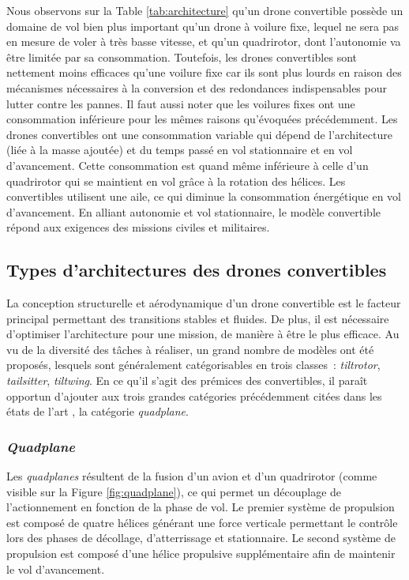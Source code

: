    Nous observons sur la Table \ref{tab:architecture} qu'un drone convertible possède un domaine de vol bien plus important qu'un drone à voilure fixe, lequel ne sera pas en mesure de voler à très basse vitesse, et qu'un quadrirotor, dont l'autonomie va être limitée par sa consommation. Toutefois, les drones convertibles sont nettement moins efficaces qu'une voilure fixe car ils sont plus lourds en raison des mécanismes nécessaires à la conversion et des redondances indispensables pour lutter contre les pannes. Il faut aussi noter que les voilures fixes ont une consommation inférieure pour les mêmes raisons qu'évoquées précédemment. Les drones convertibles ont une consommation variable qui dépend de l'architecture (liée à la masse ajoutée) et du temps passé en vol stationnaire et en vol d'avancement. Cette consommation est quand même inférieure à celle d'un quadrirotor qui se maintient en vol grâce à la rotation des hélices. Les convertibles utilisent une aile, ce qui diminue la consommation énergétique en vol d'avancement. En alliant autonomie et vol stationnaire, le modèle convertible répond aux exigences des missions civiles et militaires.

    \subsection{Types d'architectures des drones convertibles}
    \label{sec:archConvertible}
    La conception structurelle et aérodynamique d'un drone convertible est le facteur principal permettant des transitions stables et fluides. De plus, il est nécessaire d'optimiser l'architecture pour une mission, de manière à être le plus efficace. Au vu de la diversité des tâches à réaliser, un grand nombre de modèles ont été proposés, lesquels sont généralement catégorisables en trois classes : \textit{tiltrotor}, \textit{tailsitter}, \textit{tiltwing}. 
    En ce qu'il s'agit des prémices des convertibles, il paraît opportun d'ajouter aux trois grandes catégories précédemment citées dans les états de l'art \cite{saeed_survey_2018,ducard_review_2021, review_2022}, la catégorie \textit{quadplane}.

    
        \subsubsection*{\textit{Quadplane}}
        Les \textit{quadplanes} résultent de la fusion d'un avion et d'un quadrirotor (comme visible sur la Figure \ref{fig:quadplane}), ce qui permet un découplage de l'actionnement en fonction de la phase de vol. Le premier système de propulsion est composé de quatre hélices générant une force verticale permettant le contrôle lors des phases de décollage, d'atterrissage et stationnaire. Le second système de propulsion est composé d'une hélice propulsive supplémentaire afin de maintenir le vol d'avancement.

